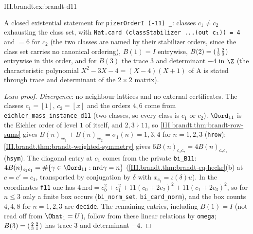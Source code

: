 \begin{tfformal}{III.brandt.ex:brandt-d11}
\begin{tffidelity}
A closed existential statement for \texttt{pizerOrderI (-11) \_}: classes $c_1\neq c_2$ exhausting the class set, with \texttt{Nat.card (classStabilizer ...(out c₁)) = 4} and $=6$ for $c_2$ (the two classes are named by their stabilizer orders, since the class set carries no canonical ordering), $B(1)=I$ entrywise, $B(2)=\begin{psmallmatrix}1&2\\3&0\end{psmallmatrix}$ entrywise in this order, and for $B(3)$ the trace $3$ and determinant $-4$ in $\Z$ (the characteristic polynomial $X^2-3X-4=(X-4)(X+1)$ of A is stated through trace and determinant of the $2\times 2$ matrix).
\end{tffidelity}
\end{tfformal}
\begin{proof}[Lean proof]
\emph{Divergence}: no neighbour lattices and no external certificates. The classes $c_1=[1]$, $c_2=[x]$ and the orders $4,6$ come from \texttt{eichler\_mass\_instance\_d11} (two classes, so every class is $c_1$ or $c_2$). $\Oord_{11}$ is the Eichler order of level $1$ of itself, and $2,3\nmid11$, so \cref{III.brandt.thm:brandt-row-sums} gives $B(n)_{cc_1}+B(n)_{cc_2}=\sigma_1(n)=1,3,4$ for $n=1,2,3$ (\texttt{hrow}); \cref{III.brandt.thm:brandt-weighted-symmetry} gives $6B(n)_{c_1c_2}=4B(n)_{c_2c_1}$ (\texttt{hsym}). The diagonal entry at $c_1$ comes from the private \texttt{bi\_B11}: $4B(n)_{c_1c_1}=\#\{\gamma\in\Oord_{11}:\mathrm{nrd}\gamma=n\}$ (\cref{III.brandt.thm:brandt-eq-hecke}(b) at $c=c'=c_1$, transported by conjugation by $\delta$ with $x_{c_1}=\iota(\delta)u$). In the coordinates \texttt{f11} one has $4\,\mathrm{nrd}=c_0^2+c_1^2+11(c_0+2c_2)^2+11(c_1+2c_3)^2$, so for $n\le3$ only a finite box occurs (\texttt{bi\_norm\_set}, \texttt{bi\_card\_norm}), and the box counts $4,4,8$ for $n=1,2,3$ are \texttt{decide}. The remaining entries, including $B(1)=I$ (not read off from $\Ohat_1=U$), follow from these linear relations by \texttt{omega}; $B(3)=\begin{psmallmatrix}2&2\\3&1\end{psmallmatrix}$ has trace $3$ and determinant $-4$.
\end{proof}

